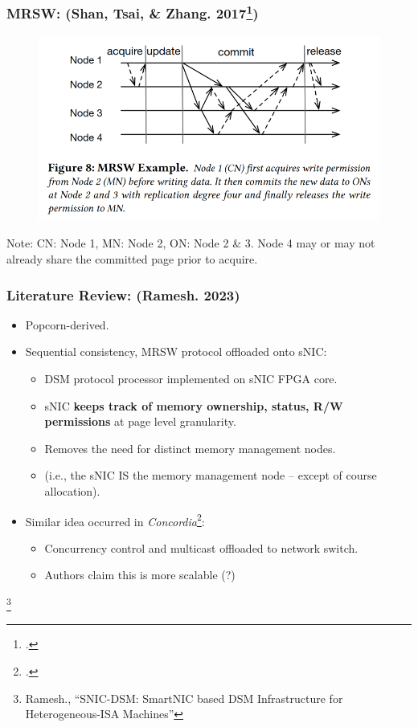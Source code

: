 \documentclass{beamer}
\begin{document}
\begin{frame}
    \frametitle{MRSW: (Shan, Tsai, \& Zhang. 2017\footcite{shan2017distributed})}
    \begin{figure}
        \includegraphics[width=\linewidth]{w12_slides_resources/dspm.fig8.png}
    \end{figure}
    Note: CN: Node 1, MN: Node 2, ON: Node 2 \& 3. Node 4 may or may not already
    share the committed page prior to acquire.
\end{frame}

\begin{frame}
    \frametitle{Literature Review: (Ramesh. 2023)}
    \begin{itemize}
        \item Popcorn-derived.
        \item {
            Sequential consistency, MRSW protocol offloaded onto sNIC:
            \begin{itemize}
                \item DSM protocol processor implemented on sNIC FPGA core.
                \item sNIC \textbf{keeps track of memory ownership, status, R/W permissions} at page level granularity.
                \item Removes the need for distinct memory management nodes.
                \item (i.e., the sNIC IS the memory management node -- except of course allocation).
            \end{itemize}
        }
        \item {
            Similar idea occurred in \textit{Concordia}\footcite{wang2021concordia}:
            \begin{itemize}
                \item Concurrency control and multicast offloaded to network switch.
                \item Authors claim this is more scalable (?)
            \end{itemize}
        }
    \end{itemize}
    \footnote{
        Ramesh., ``SNIC-DSM: SmartNIC based DSM Infrastructure for Heterogeneous-ISA Machines''
    }
\end{frame}
\end{document}
